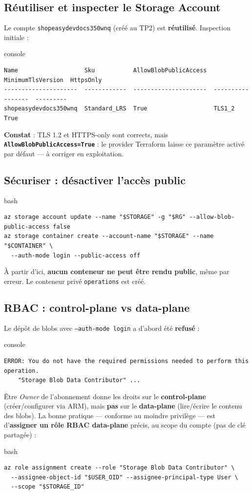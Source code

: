 \documentclass[11pt,a4paper]{article}
\newcommand{\code}[1]{\texttt{#1}}
\begin{document}
\subsection{Réutiliser et inspecter le Storage Account}
Le compte \code{shopeasydevdocs350wnq} (créé au TP2) est \textbf{réutilisé}. Inspection initiale :
\begin{codebox}{console}
\begin{Verbatim}
Name                   Sku           AllowBlobPublicAccess  MinimumTlsVersion  HttpsOnly
---------------------  ------------  ---------------------  -----------------  ---------
shopeasydevdocs350wnq  Standard_LRS  True                   TLS1_2             True
\end{Verbatim}
\end{codebox}
\textbf{Constat} : TLS 1.2 et HTTPS-only sont corrects, mais \textbf{\code{AllowBlobPublicAccess=True}} : le provider Terraform laisse ce paramètre activé par défaut — à corriger en exploitation.

\subsection{Sécuriser : désactiver l'accès public}
\begin{codebox}{bash}
\begin{Verbatim}
az storage account update --name "$STORAGE" -g "$RG" --allow-blob-public-access false
az storage container create --account-name "$STORAGE" --name "$CONTAINER" \
  --auth-mode login --public-access off
\end{Verbatim}
\end{codebox}
À partir d'ici, \textbf{aucun conteneur ne peut être rendu public}, même par erreur. Le conteneur privé \code{operations} est créé.

\subsection{RBAC : control-plane vs data-plane}
Le dépôt de blobs avec \code{--auth-mode login} a d'abord été \textbf{refusé} :
\begin{codebox}{console}
\begin{Verbatim}
ERROR: You do not have the required permissions needed to perform this operation.
    "Storage Blob Data Contributor" ...
\end{Verbatim}
\end{codebox}
Être \textit{Owner} de l'abonnement donne les droits sur le \textbf{control-plane} (créer/configurer via ARM), mais \textbf{pas} sur le \textbf{data-plane} (lire/écrire le contenu des blobs). La bonne pratique — conforme au moindre privilège — est d'\textbf{assigner un rôle RBAC data-plane} précis, au scope du compte (pas de clé partagée) :
\begin{codebox}{bash}
\begin{Verbatim}
az role assignment create --role "Storage Blob Data Contributor" \
  --assignee-object-id "$USER_OID" --assignee-principal-type User \
  --scope "$STORAGE_ID"
\end{Verbatim}
\end{codebox}
\end{document}
